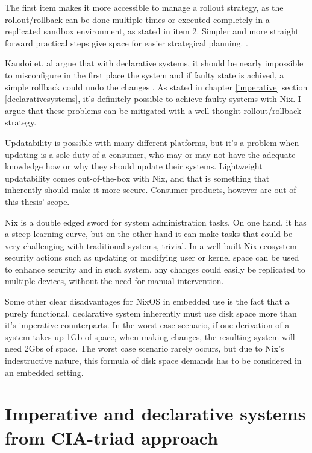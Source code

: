 The first item makes it more accessible to manage a rollout strategy,
as the rollout/rollback can be done multiple times or executed
completely in a replicated sandbox environment, as stated in item
2. Simpler and more straight forward practical steps give space for 
easier strategical planning. \cite{kandoi2021operating}.

Kandoi et. al argue that with declarative systems, it should be nearly
impossible to misconfigure in the first place the system and if faulty
state is achived, a simple rollback could undo the changes
\cite{kandoi2021operating}. As stated in chapter \ref{imperative}
section \ref{declarativesystems}, it's definitely possible
to achieve faulty systems with Nix. I argue that these problems can be
mitigated with a well thought rollout/rollback strategy. 

Updatability is possible with many different platforms, but it's a
problem when updating is a sole duty of a consumer, who may or may not
have the adequate knowledge how or why they should update their
systems. Lightweight updatability comes out-of-the-box with Nix, and
that is something that inherently should make it more secure. Consumer
products, however are out of this thesis' scope.

Nix is a double edged sword for system administration tasks. On 
one hand, it has a steep learning curve, but on the other hand it
can make tasks that could be very challenging with traditional
systems, trivial. In a well built Nix ecosystem security actions such
as updating or modifying user or kernel space can be used to enhance
security and in such system, any changes could easily be replicated to
multiple devices, without the need for manual intervention.

Some other clear disadvantages for NixOS in embedded use is the fact
that a purely functional, declarative system inherently must use disk
space more than it's imperative counterparts. In the worst case
scenario, if one derivation of a system takes up 1Gb of space, when
making changes, the resulting system will need 2Gbs of space. The
worst case scenario rarely occurs, but due to Nix's indestructive
nature, this formula of disk space demands has to be considered in an
embedded setting. \cite{dolstra2007purely}

\section{Imperative and declarative systems from CIA-triad approach} \label{imperativeanddeclarative}

